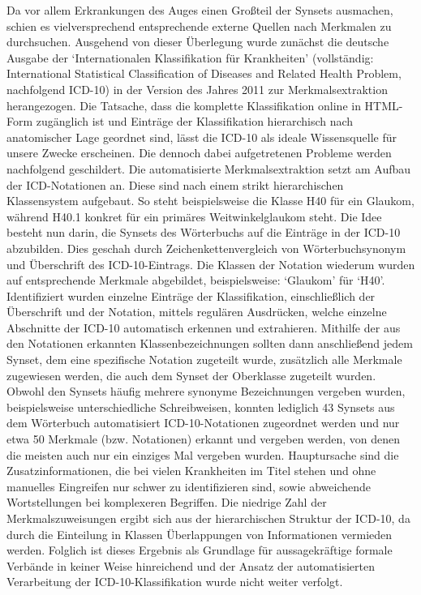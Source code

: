 \documentclass[pagesize,DIV=calc,12pt,draft]{scrreprt}
\begin{document}
Da vor allem Erkrankungen des Auges einen Großteil der Synsets ausmachen, schien es vielversprechend entsprechende externe Quellen nach Merkmalen zu durchsuchen. 
Ausgehend von dieser Überlegung wurde zunächst die deutsche Ausgabe der `Internationalen Klassifikation für Krankheiten' (vollständig: International Statistical Classification of Diseases and Related Health Problem, nachfolgend ICD-10) in der Version des Jahres 2011 zur Merkmalsextraktion herangezogen. 
Die Tatsache, dass die komplette Klassifikation online in HTML-Form zugänglich ist und Einträge der Klassifikation hierarchisch nach anatomischer Lage geordnet sind, lässt die ICD-10 als ideale Wissensquelle für unsere Zwecke erscheinen. 
Die dennoch dabei aufgetretenen Probleme werden nachfolgend geschildert. 
Die automatisierte Merkmalsextraktion setzt am Aufbau der ICD-Notationen an. 
Diese sind nach einem strikt hierarchischen Klassensystem aufgebaut. 
So steht beispielsweise die Klasse H40 für ein Glaukom, während H40.1 konkret für ein primäres Weitwinkelglaukom steht. 
Die Idee besteht nun darin, die Synsets des Wörterbuchs auf die Einträge in der ICD-10 abzubilden. 
Dies geschah durch Zeichenkettenvergleich von Wörterbuchsynonym und Überschrift des ICD-10-Eintrags. 
Die Klassen der Notation wiederum wurden auf entsprechende Merkmale abgebildet, beispielsweise: `Glaukom' für `H40'. 
Identifiziert wurden einzelne Einträge der Klassifikation, einschließlich der Überschrift und der Notation, mittels regulären Ausdrücken, welche einzelne Abschnitte der ICD-10 automatisch erkennen und extrahieren. 
Mithilfe der aus den Notationen erkannten Klassenbezeichnungen sollten dann anschließend jedem Synset, dem eine spezifische Notation zugeteilt wurde, zusätzlich alle Merkmale zugewiesen werden, die auch dem Synset der Oberklasse zugeteilt wurden. 
Obwohl den Synsets häufig mehrere synonyme Bezeichnungen vergeben wurden, beispielsweise unterschiedliche Schreibweisen, konnten lediglich 43 Synsets aus dem Wörterbuch automatisiert ICD-10-Notationen zugeordnet werden und nur etwa 50 Merkmale (bzw. 
Notationen) erkannt und vergeben werden, von denen die meisten auch nur ein einziges Mal vergeben wurden. 
Hauptursache sind die Zusatzinformationen, die bei vielen Krankheiten im Titel stehen und ohne manuelles Eingreifen nur schwer zu identifizieren sind, sowie abweichende Wortstellungen bei komplexeren Begriffen. 
Die niedrige Zahl der Merkmalszuweisungen ergibt sich aus der hierarchischen Struktur der ICD-10, da durch die Einteilung in Klassen Überlappungen von Informationen vermieden werden. 
Folglich ist dieses Ergebnis als Grundlage für aussagekräftige formale Verbände in keiner Weise hinreichend und der Ansatz der automatisierten Verarbeitung der ICD-10-Klassifikation wurde nicht weiter verfolgt. 
\end{document}
